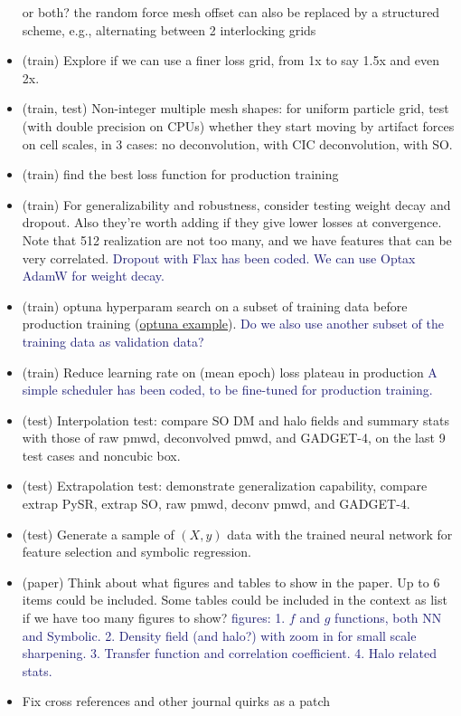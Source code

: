 \documentclass[modern, trackchanges, dvipsnames]{aastex631}
\newcommand{\GADGET}{{{\fontsize{10pt}{12pt}\selectfont GADGET}-4}}
\newcommand{\YZ}[1]{\textcolor{MidnightBlue}{#1}}
\begin{document}
\begin{itemize}
  or both? the random force mesh offset can also be replaced by a
  structured scheme, e.g., alternating between 2 interlocking grids
\item (train) Explore if we can use a finer loss grid, from 1x to say
  1.5x and even 2x.
\item (train, test) Non-integer multiple mesh shapes: for uniform
  particle grid, test (with double precision on CPUs) whether they start
  moving by artifact forces on cell scales, in 3 cases: no
  deconvolution, with CIC deconvolution, with SO.
\item (train) find the best loss function for production training
\item (train) For generalizability and robustness, consider testing
  weight decay and dropout. Also they're worth adding if they give lower
  losses at convergence. Note that 512 realization are not too many, and
  we have features that can be very correlated.\newline
  \YZ{Dropout with Flax has been coded. We can use Optax AdamW for weight decay.}
\item (train) optuna hyperparam search on a subset of training data
  before production training
  (\href{https://github.com/optuna/optuna-examples/blob/main/haiku/haiku_simple.py}{optuna
  example}).\newline
  \YZ{Do we also use another subset of the training data as validation data?}
\item (train) Reduce learning rate on (mean epoch) loss plateau in
  production\newline
  \YZ{A simple scheduler has been coded, to be fine-tuned for production training.}
\item (test) Interpolation test: compare SO DM and halo fields and
  summary stats with those of raw pmwd, deconvolved pmwd, and \GADGET,
  on the last 9 test cases and noncubic box.
\item (test) Extrapolation test: demonstrate generalization capability,
  compare extrap PySR, extrap SO, raw pmwd, deconv pmwd, and \GADGET.
\item (test) Generate a sample of $(X, y)$ data with the trained neural network
  for feature selection and symbolic regression.
\item (paper) Think about what figures and tables to show in the paper. Up
to 6 items could be included. Some tables could be included in the context as
list if we have too many figures to show?\newline
  \YZ{figures:
  1. $f$ and $g$ functions, both NN and Symbolic.
  2. Density field (and halo?) with zoom in for small scale sharpening.
  3. Transfer function and correlation coefficient.
  4. Halo related stats.}
\item Fix cross references and other journal quirks as a patch
\end{itemize}
\end{document}
